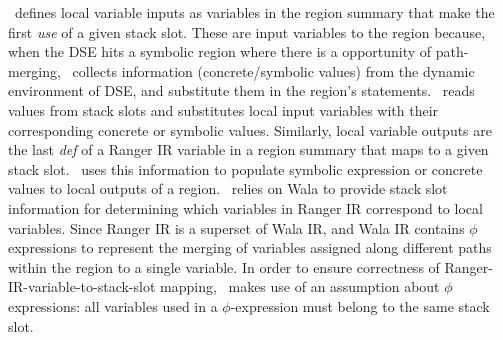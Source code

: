 \toolshort\ defines local variable inputs as variables in the region summary that make the first \textit{use} of a
given stack slot.
%
These are input variables to the region because, when the DSE hits a symbolic region where there is a opportunity of
path-merging, \toolshort\ collects information (concrete/symbolic values) from the dynamic environment of DSE, and
substitute them in the region's statements.
%
\toolshort\ reads values from stack slots and substitutes local input variables with their
corresponding concrete or symbolic values.
%
%
%
Similarly, local variable outputs are the last \textit{def} of a Ranger IR variable in a region summary that maps to a given
stack slot.
%
\toolshort\ uses this information to populate symbolic expression or concrete values to local outputs of a region.
%
%
%
\toolshort\ relies on Wala to provide stack slot information for determining which variables in Ranger IR correspond to
local variables.
%
%
Since Ranger IR is a superset of Wala IR, and Wala IR contains $\phi$ expressions to represent the merging of variables
assigned along different paths within the region to a single variable.
%
In order to ensure correctness of Ranger-IR-variable-to-stack-slot mapping, \toolshort\ makes use of an assumption about
$\phi$ expressions: all variables used in a $\phi$-expression must belong to the same stack slot.
%

%
%
%
%
%

